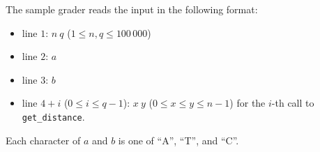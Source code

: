 The sample grader reads the input in the following format:
\begin{itemize}
\item line $1$: $n\ q$ ($1 \leq n, q \leq 100\,000$)
\item line $2$: $a$
\item line $3$: $b$
\item line $4 + i$ ($0 \leq i \leq q - 1$): $x\ y$ ($0 \leq x \leq y \leq n-1$) for the $i$-th call to \texttt{get\_distance}. 
\end{itemize}

Each character of $a$ and $b$ is one of ``A'', ``T'', and ``C''.